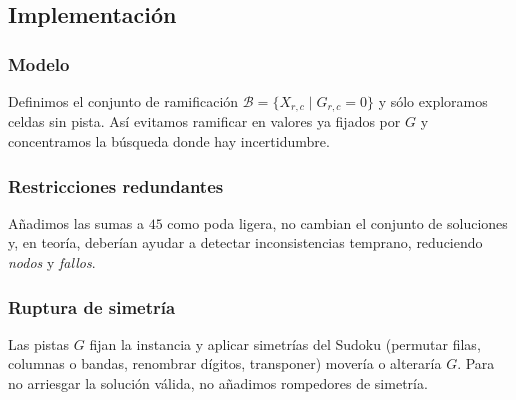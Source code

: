 
\subsection{Implementación}\label{sec:01-sudoku-implementacion}

\subsubsection*{Modelo}
Definimos el conjunto de ramificación \(\mathcal{B}=\{X_{r,c}\mid G_{r,c}=0\}\) y sólo exploramos celdas sin pista. Así evitamos ramificar en valores ya fijados por \(G\) y concentramos la búsqueda donde hay incertidumbre.

\subsubsection*{Restricciones redundantes}
Añadimos las sumas a \(45\) como poda ligera, no cambian el conjunto de soluciones y, en teoría, deberían ayudar a detectar inconsistencias temprano, reduciendo \emph{nodos} y \emph{fallos}.

\subsubsection*{Ruptura de simetría}
Las pistas \(G\) fijan la instancia y aplicar simetrías del Sudoku (permutar filas, columnas o bandas, renombrar dígitos, transponer) movería o alteraría \(G\). Para no arriesgar la solución válida, no añadimos rompedores de simetría.
